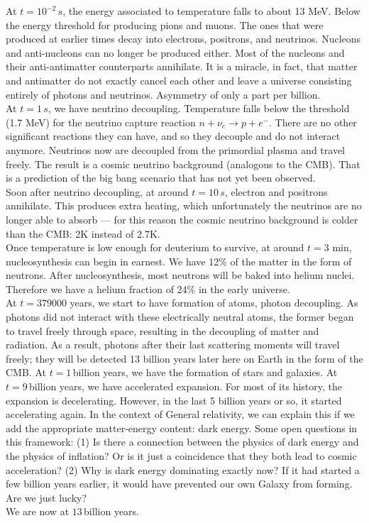 \documentclass[11pt]{article}
\theoremstyle{break}
\theoremstyle{break}
\begin{document}
At $t= 10^{-2}\, s$, the energy associated to temperature falls to about 13 MeV. Below the energy threshold for producing pions and muons. The ones that were produced at earlier times decay into electrons, positrons, and neutrinos.
Nucleons and anti-nucleons can no longer be produced either.
Most of the nucleons and their anti-antimatter counterparts annihilate. It is a miracle, in fact, that matter and antimatter do not exactly cancel each other and leave a universe consisting entirely of photons and neutrinos. Asymmetry of only a part per billion.\\

At $t=1\,s$, we have neutrino decoupling. Temperature falls below the threshold (1.7 MeV) for the neutrino capture reaction $
n + \nu_e \to p+e^-$. There are no other significant reactions they can have,
and so they decouple and do not interact anymore. Neutrinos now are decoupled from the primordial plasma and travel freely. The result is a cosmic neutrino background (analogous to the CMB). That is a prediction of the big bang scenario that has not yet been observed.\\

Soon after neutrino decoupling, at around $t = 10\, s$, electron and positrons annihilate. This produces extra heating, which unfortunately the neutrinos are no longer able to absorb — for this reason the cosmic neutrino background is colder than the CMB: 2K instead of 2.7K.\\

Once temperature is low enough for deuterium to survive, at around $t = 3$  min, nucleosynthesis can begin in earnest. We have 12$\%$ of the matter in the form of neutrons. After nucleosynthesis, most neutrons will be baked into helium nuclei. 
Therefore we have a helium fraction of 24$\%$ in the early universe.\\

At $t = 379000$ years, we start to have formation of atoms, photon decoupling.  As photons did not interact with these electrically neutral atoms, the former began to travel freely through space, resulting in the decoupling of matter and
radiation. As a result, photons after their last scattering moments will travel freely; they will be detected
13 billion years later here on Earth in the form of the CMB. At $t = 1\,$billion years, we have the formation of stars and galaxies. At $t = 9\,$billion years, we have accelerated expansion. For most of its history, the expansion is decelerating. However, in the last 5 billion years or so, it started accelerating again. In the context of General relativity, we can explain this if we add the appropriate matter-energy content: dark energy. Some open questions in this framework: (1) Is there a connection between the physics of dark energy and the physics of inflation? Or is it just a coincidence that they both lead to cosmic acceleration? (2) Why is dark energy dominating exactly now? If it had started a few billion years earlier, it would have prevented our own Galaxy from forming. Are we just lucky? \\

We are now at $13\,$billion years. 
\end{document}
